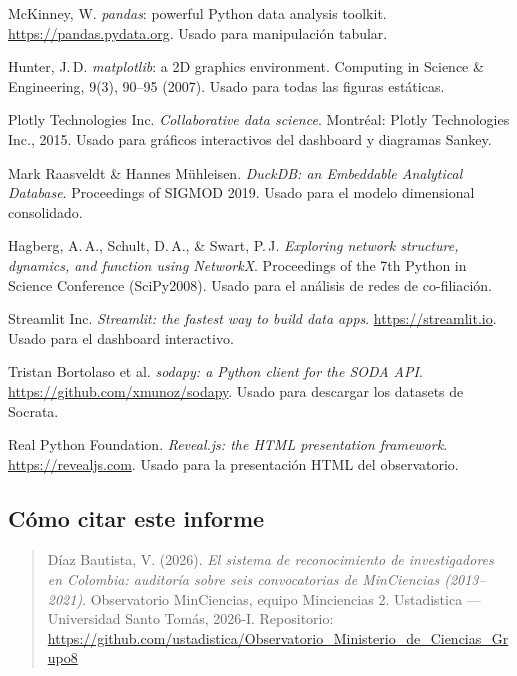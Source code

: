 \documentclass[11pt,a4paper,oneside]{article}
\newcommand{\repoUrl}{https://github.com/ustadistica/Observatorio\_Ministerio\_de\_Ciencias\_Grupo8}
\begin{document}
\begin{enumerate}[label={[}\arabic*{]},start=11,leftmargin=2.2em,itemsep=4pt]
\item McKinney, W. \emph{pandas}: powerful Python data analysis toolkit. \\
\url{https://pandas.pydata.org}. Usado para manipulación tabular.

\item Hunter, J.\,D. \emph{matplotlib}: a 2D graphics environment. Computing in Science \& Engineering, 9(3), 90--95 (2007). Usado para todas las figuras estáticas.

\item Plotly Technologies Inc. \emph{Collaborative data science}. Montréal: Plotly Technologies Inc., 2015. Usado para gráficos interactivos del dashboard y diagramas Sankey.

\item Mark Raasveldt \& Hannes Mühleisen. \emph{DuckDB: an Embeddable Analytical Database}. Proceedings of SIGMOD 2019. Usado para el modelo dimensional consolidado.

\item Hagberg, A.\,A., Schult, D.\,A., \& Swart, P.\,J. \emph{Exploring network structure, dynamics, and function using NetworkX}. Proceedings of the 7th Python in Science Conference (SciPy2008). Usado para el análisis de redes de co-filiación.

\item Streamlit Inc. \emph{Streamlit: the fastest way to build data apps}. \url{https://streamlit.io}. Usado para el dashboard interactivo.

\item Tristan Bortolaso et al. \emph{sodapy: a Python client for the SODA API}. \url{https://github.com/xmunoz/sodapy}. Usado para descargar los datasets de Socrata.

\item Real Python Foundation. \emph{Reveal.js: the HTML presentation framework}. \url{https://revealjs.com}. Usado para la presentación HTML del observatorio.
\end{enumerate}

\subsection*{Cómo citar este informe}

\begin{quote}
\footnotesize
Díaz Bautista, V. (2026). \emph{El sistema de reconocimiento de investigadores en Colombia: auditoría sobre seis convocatorias de MinCiencias (2013--2021)}. Observatorio MinCiencias, equipo Minciencias 2. Ustadistica --- Universidad Santo Tomás, 2026-I. Repositorio: \\
\url{\repoUrl}
\end{quote}
\end{document}
